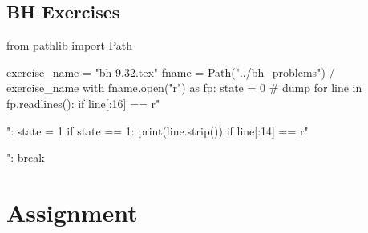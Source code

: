 \subsection{BH Exercises}
\label{sec:bh-exercises-1}


\begin{pycode}
from pathlib import Path

exercise_name = "bh-9.32.tex"
fname = Path("../bh_problems") / exercise_name
with fname.open("r") as fp:
    state = 0  # dump
    for line in fp.readlines():
        if line[:16] == r"\begin{exercise}":
            state = 1
        if state == 1:
            print(line.strip())
        if line[:14] == r"\end{exercise}":
            break
\end{pycode}













\section{Assignment}
\label{sec:assignment}

%






